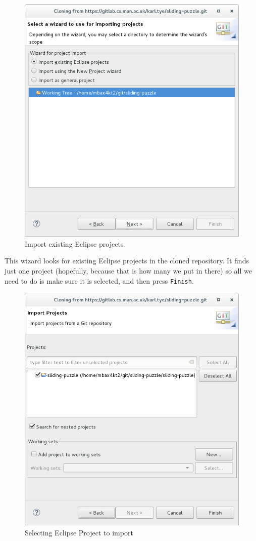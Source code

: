 \documentclass[
]{book}
\begin{document}
\begin{figure}

{\centering \includegraphics[width=0.8\linewidth]{images/importExistingEclipseProjects} 

}

\caption{Import existing Eclipse projects }\label{fig:importExistingEclipseProjects-fig}
\end{figure}

This wizard looks for existing Eclipse projects in the cloned repository. It finds just one project (hopefully, because that is how many we put in there) so all we need to do is make sure it is selected, and then press \texttt{Finish}.

\begin{figure}

{\centering \includegraphics[width=0.8\linewidth]{images/selectEclipseProjectToImport} 

}

\caption{Selecting Eclipse Project to import}\label{fig:selectEclipseProjectToImport-fig}
\end{figure}
\end{document}
